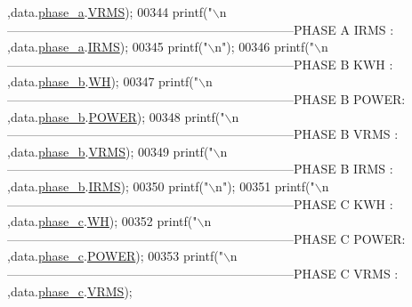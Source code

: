 \begin{DoxyCode}
{{{{{{{{{      ,data.\hyperlink{a00029_ad7205e9853a503d2fab0697f5a301f6c}{phase\_a}.\hyperlink{a00030_a08415029e214174a01bc6487ff98ee9b}{VRMS});
00344         printf(\textcolor{stringliteral}{"\(\backslash\)n---------------------------------------------------------------------PHASE A IRMS : %
      ,data.\hyperlink{a00029_ad7205e9853a503d2fab0697f5a301f6c}{phase\_a}.\hyperlink{a00030_a4f87f30b543e89e2e5dfa1b8f3f58eff}{IRMS});
00345         printf(\textcolor{stringliteral}{"\(\backslash\)n"});
00346         printf(\textcolor{stringliteral}{"\(\backslash\)n---------------------------------------------------------------------PHASE B KWH  : %
      ,data.\hyperlink{a00029_a48734adeb4d59d056b6e39c6e08fe21e}{phase\_b}.\hyperlink{a00030_a8dd6d8406db4e214238b3eff481e4ea0}{WH});
00347         printf(\textcolor{stringliteral}{"\(\backslash\)n---------------------------------------------------------------------PHASE B POWER: %
      ,data.\hyperlink{a00029_a48734adeb4d59d056b6e39c6e08fe21e}{phase\_b}.\hyperlink{a00030_a8a9794fa4c6a69b457d1eb04b017ef1e}{POWER});
00348         printf(\textcolor{stringliteral}{"\(\backslash\)n---------------------------------------------------------------------PHASE B VRMS : %
      ,data.\hyperlink{a00029_a48734adeb4d59d056b6e39c6e08fe21e}{phase\_b}.\hyperlink{a00030_a08415029e214174a01bc6487ff98ee9b}{VRMS});
00349         printf(\textcolor{stringliteral}{"\(\backslash\)n---------------------------------------------------------------------PHASE B IRMS : %
      ,data.\hyperlink{a00029_a48734adeb4d59d056b6e39c6e08fe21e}{phase\_b}.\hyperlink{a00030_a4f87f30b543e89e2e5dfa1b8f3f58eff}{IRMS});
00350         printf(\textcolor{stringliteral}{"\(\backslash\)n"});
00351         printf(\textcolor{stringliteral}{"\(\backslash\)n---------------------------------------------------------------------PHASE C KWH  : %
      ,data.\hyperlink{a00029_ad8892f27909cf51f7603adfc00d224df}{phase\_c}.\hyperlink{a00030_a8dd6d8406db4e214238b3eff481e4ea0}{WH});
00352         printf(\textcolor{stringliteral}{"\(\backslash\)n---------------------------------------------------------------------PHASE C POWER: %
      ,data.\hyperlink{a00029_ad8892f27909cf51f7603adfc00d224df}{phase\_c}.\hyperlink{a00030_a8a9794fa4c6a69b457d1eb04b017ef1e}{POWER});
00353         printf(\textcolor{stringliteral}{"\(\backslash\)n---------------------------------------------------------------------PHASE C VRMS : %
      ,data.\hyperlink{a00029_ad8892f27909cf51f7603adfc00d224df}{phase\_c}.\hyperlink{a00030_a08415029e214174a01bc6487ff98ee9b}{VRMS});
}}}}}}}}}}}}}}}}}
\end{DoxyCode}
